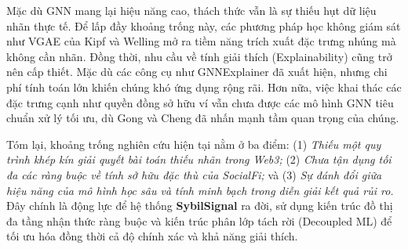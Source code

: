 Mặc dù GNN mang lại hiệu năng cao, thách thức vẫn là sự thiếu hụt dữ liệu nhãn thực tế. Để lấp đầy khoảng trống này, các phương pháp học không giám sát như VGAE của Kipf và Welling \cite{kipf2016variational} mở ra tiềm năng trích xuất đặc trưng nhúng mà không cần nhãn. Đồng thời, nhu cầu về tính giải thích (Explainability) cũng trở nên cấp thiết. Mặc dù các công cụ như GNNExplainer \cite{ying2019gnnexplainer} đã xuất hiện, nhưng chi phí tính toán lớn khiến chúng khó ứng dụng rộng rãi. Hơn nữa, việc khai thác các đặc trưng cạnh như quyền đồng sở hữu ví vẫn chưa được các mô hình GNN tiêu chuẩn xử lý tối ưu, dù Gong và Cheng \cite{gong2019exploiting} đã nhấn mạnh tầm quan trọng của chúng.\vspace{0.3cm}

Tóm lại, khoảng trống nghiên cứu hiện tại nằm ở ba điểm: (1) \textit{Thiếu một quy trình khép kín giải quyết bài toán thiếu nhãn trong Web3;} (2) \textit{Chưa tận dụng tối đa các ràng buộc về tính sở hữu đặc thù của SocialFi;} và (3) \textit{Sự đánh đổi giữa hiệu năng của mô hình học sâu và tính minh bạch trong diễn giải kết quả rủi ro.} Đây chính là động lực để hệ thống \textbf{SybilSignal} ra đời, sử dụng kiến trúc đồ thị đa tầng nhận thức ràng buộc và kiến trúc phân lớp tách rời (Decoupled ML) để tối ưu hóa đồng thời cả độ chính xác và khả năng giải thích.
